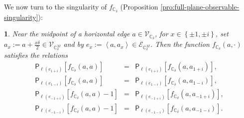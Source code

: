 \documentclass[oneside,english]{amsart}
\numberwithin{equation}{section}
\numberwithin{figure}{section}
\theoremstyle{plain}
\theoremstyle{plain}
\theoremstyle{plain}
\theoremstyle{plain}
\newtheorem{prop}[thm]{\protect\propositionname}
\theoremstyle{plain}
\theoremstyle{definition}
\theoremstyle{remark}
\providecommand{\propositionname}{Proposition}
\begin{document}
We now turn to the singularity of $f_{\mathbb{C}_{\delta}}$ (Proposition
\ref{pro:full-plane-observable-singularity}):
\begin{prop}
\label{prop:disc-singularity-full-plane-obs}Near the midpoint of
a horizontal edge $a\in\mathcal{V}_{\mathbb{C}_{\delta}}$, for $x\in\left\{ \pm1,\pm i\right\} $,
set $a_{x}:=a+\frac{x\delta}{2}\in\mathcal{V}_{\mathbb{C}_{\delta}^{M}}$
and by $e_{x}:=\left\langle a,a_{x}\right\rangle \in\mathcal{E}_{\mathbb{C}_{\delta}^{M}}$.
Then the function $f_{\mathbb{C}_{\delta}}\left(a,\cdot\right)$ satisfies
the relations 
\begin{eqnarray*}
\mathsf{P}_{\ell\left(e_{1+i}\right)}\left[f_{\mathbb{C}_{\delta}}\left(a,a\right)\right] & = & \mathsf{P}_{\ell\left(e_{1+i}\right)}\left[f_{\mathbb{C}_{\delta}}\left(a,a_{1+i}\right)\right],\\
\mathsf{P}_{\ell\left(e_{1-i}\right)}\left[f_{\mathbb{C}_{\delta}}\left(a,a\right)\right] & = & \mathsf{P}_{\ell\left(e_{1-i}\right)}\left[f_{\mathbb{C}_{\delta}}\left(a,a_{1-i}\right)\right],\\
\mathsf{P}_{\ell\left(e_{-1+i}\right)}\left[f_{\mathbb{C}_{\delta}}\left(a,a\right)-1\right] & = & \mathsf{P}_{\ell\left(e_{-1+i}\right)}\left[f_{\mathbb{C}_{\delta}}\left(a,a_{-1+i}\right)\right],\\
\mathsf{P}_{\ell\left(e_{-1-i}\right)}\left[f_{\mathbb{C}_{\delta}}\left(a,a\right)-1\right] & = & \mathsf{P}_{\ell\left(e_{-1-i}\right)}\left[f_{\mathbb{C}_{\delta}}\left(a,a_{-1-i}\right)\right].
\end{eqnarray*}
\end{prop}
\end{document}
